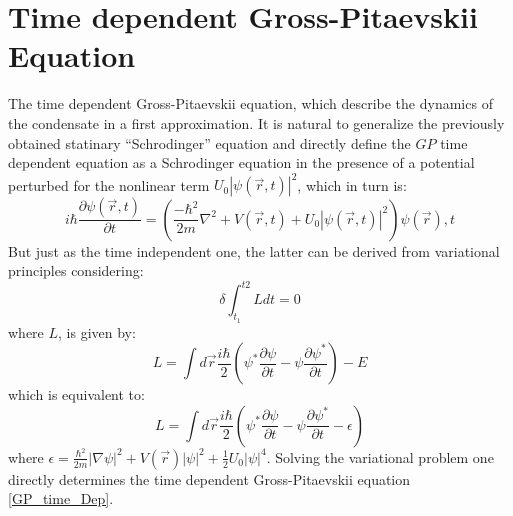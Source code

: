 \documentclass[a4paper,10pt]{article}
\begin{document}
\section{Time dependent Gross-Pitaevskii Equation}
The time dependent Gross-Pitaevskii equation, which describe the dynamics of the condensate in a first approximation. It is natural to generalize the previously obtained statinary ``Schrodinger'' equation and directly define the $GP$ time dependent equation as a Schrodinger equation in the presence of a potential perturbed for the nonlinear term $U_0|\psi(\vec{r},t)|^2$, which in turn is: 
\begin{equation}\label{GP_time_Dep}
 i\hbar \frac{\partial \psi(\vec{r},t)}{\partial t}=\left(\frac{-\hbar^2}{2m}\nabla^2 +V(\vec{r},t) +U_0 |\psi(\vec{r},t)|^2 \right)\psi(\vec{r}),t
\end{equation}
But just as the time independent one, the latter can be derived from variational principles considering:
\begin{equation}
 \delta \int_{t_1}^{t2}Ldt=0
 \end{equation}
 where $L$, is given by:
 \begin{equation}
  L=\int d\vec{r}\frac{i\hbar}{2}\left(\psi^*\frac{\partial \psi}{\partial t}-\psi \frac{\partial \psi^*}{\partial t}\right)-E
 \end{equation}
 which is equivalent to:
 \begin{equation}
  L=\int d\vec{r}\frac{i\hbar}{2}\left(\psi^*\frac{\partial \psi}{\partial t}-\psi \frac{\partial \psi^*}{\partial t}-\epsilon\right)
 \end{equation}
where $\epsilon=\frac{\hbar^2}{2m}|\nabla\psi|^2+V(\vec{r})|\psi|^2+\frac{1}{2}U_0|\psi|^4$. Solving the variational problem one directly determines the time dependent Gross-Pitaevskii equation \ref{GP_time_Dep}.
\end{document}
